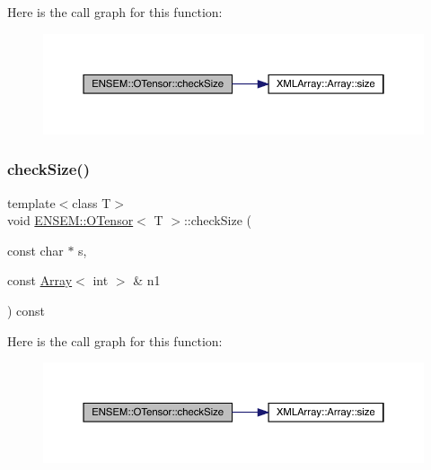 Here is the call graph for this function\+:
\nopagebreak
\begin{figure}[H]
\begin{center}
\leavevmode
\includegraphics[width=350pt]{da/d8a/classENSEM_1_1OTensor_ac59e6465eb9803b05edcdec04f8d2370_cgraph}
\end{center}
\end{figure}
\mbox{\label{classENSEM_1_1OTensor_ac59e6465eb9803b05edcdec04f8d2370}} 
\subsubsection{\texorpdfstring{checkSize()}{checkSize()}\hspace{0.1cm}{\footnotesize\ttfamily [6/6]}}
{\footnotesize\ttfamily template$<$class T$>$ \\
void \mbox{\hyperlink{classENSEM_1_1OTensor}{E\+N\+S\+E\+M\+::\+O\+Tensor}}$<$ T $>$\+::check\+Size (\begin{DoxyParamCaption}\item[{const char $\ast$}]{s,  }\item[{const \mbox{\hyperlink{classXMLArray_1_1Array}{Array}}$<$ int $>$ \&}]{n1 }\end{DoxyParamCaption}) const\hspace{0.3cm}{\ttfamily [inline]}}

Here is the call graph for this function\+:
\nopagebreak
\begin{figure}[H]
\begin{center}
\leavevmode
\includegraphics[width=350pt]{da/d8a/classENSEM_1_1OTensor_ac59e6465eb9803b05edcdec04f8d2370_cgraph}
\end{center}
\end{figure}
\mbox{\label{classENSEM_1_1OTensor_a18a4095f1e99228c27768fbea8eec05d}} 

